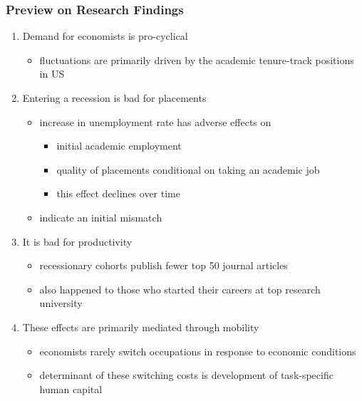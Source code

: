 \documentclass[10pt,svgnames,fragile]{beamer}
\begin{document}
\begin{frame}
	\frametitle{Preview on Research Findings}
	\begin{enumerate}
		\item Demand for economists is pro-cyclical
		\begin{itemize}
			\item fluctuations are primarily driven by the academic tenure-track positions in  US
		\end{itemize}
\vfill
		\item Entering a recession is bad for placements
		\begin{itemize}
			\item  increase in unemployment rate has adverse effects on
			\begin{itemize}
				\item initial academic employment 
				\item quality of placements conditional on taking an academic job
				\item this effect declines over time
			\end{itemize}
		\item indicate an initial mismatch
		\end{itemize}
\vfill
				\item It is bad for productivity
		\begin{itemize}
			\item recessionary cohorts publish fewer top 50 journal articles
			\item also happened to those who started their careers at top research university
		\end{itemize}
\vfill
		\item These effects are primarily mediated through mobility			
		\begin{itemize}
			\item economists rarely switch occupations in response to  economic conditions
			\item determinant of these switching costs is development of task-specific human capital
\vfill
		\end{itemize}
	\end{enumerate}
\end{frame}
\end{document}
